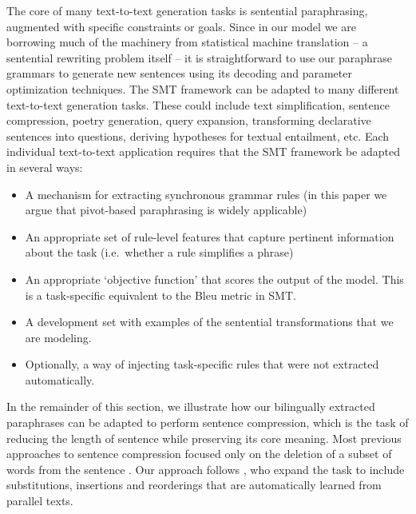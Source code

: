 \documentclass[11pt]{article}
\begin{document}
The core of many text-to-text generation tasks is sentential
paraphrasing, augmented with specific constraints or
goals. Since in our model we are borrowing much of the machinery 
from statistical machine translation -- a sentential rewriting problem
itself -- it is straightforward to use our paraphrase grammars to generate new sentences using its decoding and parameter optimization techniques. The SMT framework  can be adapted to 
many different text-to-text generation tasks. 
These could include text simplification, sentence compression, poetry generation,
  query expansion,  transforming declarative sentences into questions, deriving hypotheses for textual entailment, etc. 
Each individual text-to-text application requires that the SMT framework be adapted in several ways:
\begin{itemize}
\item A mechanism for extracting synchronous grammar rules (in this paper we argue that pivot-based paraphrasing is widely applicable)
\item An appropriate set of rule-level features that capture pertinent information about the task
 (i.e.\ whether a rule simplifies a phrase)
\item An appropriate `objective function' that scores the output of the model.  This is a task-specific equivalent to the Bleu metric in SMT.
\item A development set with examples of the sentential transformations that we are modeling.  
\item Optionally, a way of injecting task-specific rules that were not extracted automatically.
\end{itemize} 
In the remainder of this section, we illustrate how our bilingually extracted paraphrases can be adapted to perform sentence compression,
which is the task of reducing the length of sentence while preserving its core
meaning.  Most previous approaches to sentence compression focused only on the deletion of a subset of words from the sentence \cite{KnightMarcuAI02}.  Our approach follows 
, who expand the task to include substitutions, insertions and reorderings that are automatically learned from parallel texts.
\end{document}
